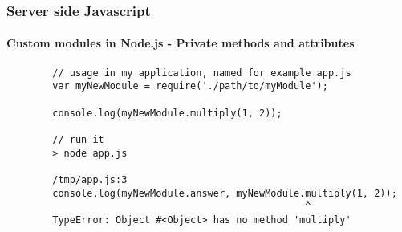 \documentclass{beamer}
\begin{document}
	\begin{frame}[fragile]
		\frametitle{Server side Javascript}
		\framesubtitle{Custom modules in Node.js - Private methods and attributes}

		\begin{verbatim}
		// usage in my application, named for example app.js
		var myNewModule = require('./path/to/myModule');

		console.log(myNewModule.multiply(1, 2));

		// run it
		> node app.js

		/tmp/app.js:3
		console.log(myNewModule.answer, myNewModule.multiply(1, 2));
		                                            ^
		TypeError: Object #<Object> has no method 'multiply'
		\end{verbatim}
	\end{frame}
\end{document}
